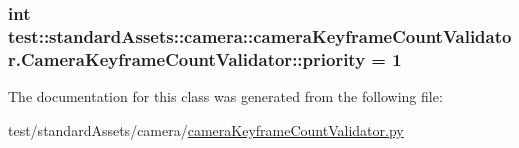 \hypertarget{classtest_1_1standardAssets_1_1camera_1_1cameraKeyframeCountValidator_1_1CameraKeyframeCountValidator_aa4e1d091da82cbd317bf812b6e8c1b10}{
\subsubsection[{priority}]{\setlength{\rightskip}{0pt plus 5cm}int {\bf test\-::standard\-Assets\-::camera\-::camera\-Keyframe\-Count\-Validator.\-Camera\-Keyframe\-Count\-Validator\-::priority} = 1}}\label{de/d8f/classtest_1_1standardAssets_1_1camera_1_1cameraKeyframeCountValidator_1_1CameraKeyframeCountValidator_aa4e1d091da82cbd317bf812b6e8c1b10}


\-The documentation for this class was generated from the following file\-:\begin{DoxyCompactItemize}
\item 
test/standard\-Assets/camera/\hyperlink{standardAssets_2camera_2cameraKeyframeCountValidator_8py}{camera\-Keyframe\-Count\-Validator.\-py}\end{DoxyCompactItemize}
